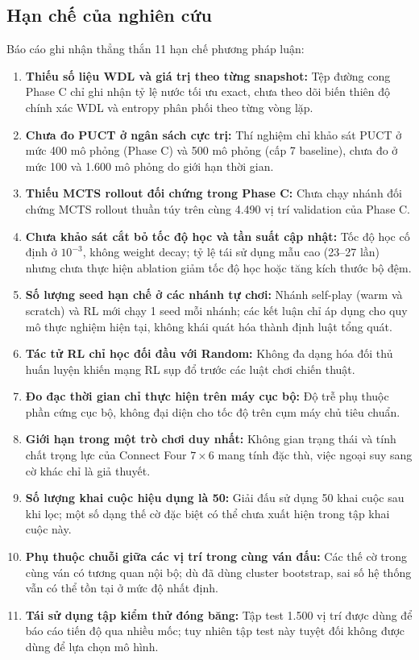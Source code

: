 \documentclass[11pt, a4paper]{article}
\begin{document}
\subsection{Hạn chế của nghiên cứu}
Báo cáo ghi nhận thẳng thắn 11 hạn chế phương pháp luận:
\begin{enumerate}
    \item \textbf{Thiếu số liệu WDL và giá trị theo từng snapshot:} Tệp đường cong Phase C chỉ ghi nhận tỷ lệ nước tối ưu exact, chưa theo dõi biến thiên độ chính xác WDL và entropy phân phối theo từng vòng lặp.
    \item \textbf{Chưa đo PUCT ở ngân sách cực trị:} Thí nghiệm chỉ khảo sát PUCT ở mức 400 mô phỏng (Phase C) và 500 mô phỏng (cấp 7 baseline), chưa đo ở mức 100 và 1.600 mô phỏng do giới hạn thời gian.
    \item \textbf{Thiếu MCTS rollout đối chứng trong Phase C:} Chưa chạy nhánh đối chứng MCTS rollout thuần túy trên cùng 4.490 vị trí validation của Phase C.
    \item \textbf{Chưa khảo sát cắt bỏ tốc độ học và tần suất cập nhật:} Tốc độ học cố định ở $10^{-3}$, không weight decay; tỷ lệ tái sử dụng mẫu cao (23--27 lần) nhưng chưa thực hiện ablation giảm tốc độ học hoặc tăng kích thước bộ đệm.
    \item \textbf{Số lượng seed hạn chế ở các nhánh tự chơi:} Nhánh self-play (warm và scratch) và RL mới chạy 1 seed mỗi nhánh; các kết luận chỉ áp dụng cho quy mô thực nghiệm hiện tại, không khái quát hóa thành định luật tổng quát.
    \item \textbf{Tác tử RL chỉ học đối đầu với Random:} Không đa dạng hóa đối thủ huấn luyện khiến mạng RL sụp đổ trước các luật chơi chiến thuật.
    \item \textbf{Đo đạc thời gian chỉ thực hiện trên máy cục bộ:} Độ trễ phụ thuộc phần cứng cục bộ, không đại diện cho tốc độ trên cụm máy chủ tiêu chuẩn.
    \item \textbf{Giới hạn trong một trò chơi duy nhất:} Không gian trạng thái và tính chất trọng lực của Connect Four $7 \times 6$ mang tính đặc thù, việc ngoại suy sang cờ khác chỉ là giả thuyết.
    \item \textbf{Số lượng khai cuộc hiệu dụng là 50:} Giải đấu sử dụng 50 khai cuộc sau khi lọc; một số dạng thế cờ đặc biệt có thể chưa xuất hiện trong tập khai cuộc này.
    \item \textbf{Phụ thuộc chuỗi giữa các vị trí trong cùng ván đấu:} Các thế cờ trong cùng ván có tương quan nội bộ; dù đã dùng cluster bootstrap, sai số hệ thống vẫn có thể tồn tại ở mức độ nhất định.
    \item \textbf{Tái sử dụng tập kiểm thử đóng băng:} Tập test 1.500 vị trí được dùng để báo cáo tiến độ qua nhiều mốc; tuy nhiên tập test này tuyệt đối không được dùng để lựa chọn mô hình.
\end{enumerate}
\end{document}
